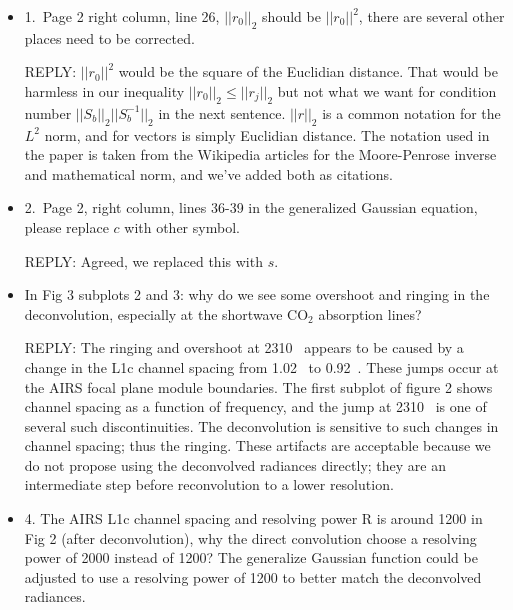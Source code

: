 \documentclass[11pt]{article}
\newcommand {\reply} {\mbox{\small REPLY}}
\begin{document}
\begin{itemize}
  \item 1.~Page 2 right column, line 26, $||r_0||_2$ should be
    $||r_0||^2$, there are several other places need to be
    corrected.

    \reply:  $||r_0||^2$ would be the square of the Euclidian
    distance.  That would be harmless in our inequality $||r_0||_2
    \le ||r_j||_2$ but not what we want for condition number
    $||S_b||_2||S_b^{-1}||_2$ in the next sentence.  $||r||_2$ is a
    common notation for the $L^2$ norm, and for vectors is simply
    Euclidian distance.  The notation used in the paper is taken
    from the Wikipedia articles for the Moore-Penrose inverse and
    mathematical norm, and we've added both as citations.


  \item 2.~Page 2, right column, lines 36-39 in the generalized
    Gaussian equation, please replace $c$ with other symbol.

    \reply: Agreed, we replaced this with $s$.

  \item In Fig 3 subplots 2 and 3: why do we see some overshoot
    and ringing in the deconvolution, especially at the shortwave
    CO$_2$ absorption lines?

    \reply: The ringing and overshoot at 2310~{\wn} appears to be
    caused by a change in the L1c channel spacing from 1.02~{\wn} to
    0.92~{\wn}.  These jumps occur at the AIRS focal plane module
    boundaries.  The first subplot of figure 2 shows channel spacing
    as a function of frequency, and the jump at 2310~{\wn} is one of
    several such discontinuities.  The deconvolution is sensitive to
    such changes in channel spacing; thus the ringing.  These
    artifacts are acceptable because we do not propose using the
    deconvolved radiances directly; they are an intermediate step
    before reconvolution to a lower resolution.  


  \item 4. The AIRS L1c channel spacing and resolving power R is
    around 1200 in Fig 2 (after deconvolution), why the direct
    convolution choose a resolving power of 2000 instead of 1200?
    The generalize Gaussian function could be adjusted to use a
    resolving power of 1200 to better match the deconvolved
    radiances.


\end{itemize}
\end{document}
